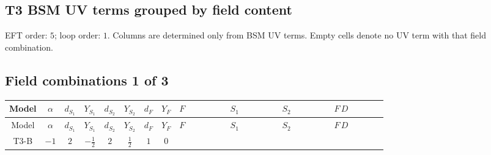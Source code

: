 \documentclass[8pt]{article}
\begin{document}
\begin{landscape}
\section*{T3 BSM UV terms grouped by field content}
EFT order: $5$; loop order: $1$. 
Columns are determined only from BSM UV terms. Empty cells denote no UV term with that field combination.
\tiny
\subsection*{Field combinations 1 of 3}
\begin{longtable}{@{}cccccccc >{\raggedright\arraybackslash}p{0.18\linewidth} >{\raggedright\arraybackslash}p{0.18\linewidth} >{\raggedright\arraybackslash}p{0.18\linewidth} >{\raggedright\arraybackslash}p{0.18\linewidth}@{}}
\toprule
Model & $\alpha$ & $d_{S_1}$ & $Y_{S_1}$ & $d_{S_2}$ & $Y_{S_2}$ & $d_F$ & $Y_F$ & $F$ & $S_1$ & $S_2$ & $F\,D$ \\
\midrule
\endfirsthead
\toprule
Model & $\alpha$ & $d_{S_1}$ & $Y_{S_1}$ & $d_{S_2}$ & $Y_{S_2}$ & $d_F$ & $Y_F$ & $F$ & $S_1$ & $S_2$ & $F\,D$ \\
\midrule
\endhead
T3-B & $-1$ & $2$ & $-\frac{1}{2}$ & $2$ & $\frac{1}{2}$ & $1$ & $0$ & \scriptsize\adjustbox{max width=\linewidth}{$\begin{gathered} -\frac{1}{2} N_{r_1}{}^T\, C\, N_{r_1} M_F\end{gathered}$} & \scriptsize\adjustbox{max width=\linewidth}{$\begin{gathered} -\text{NewScalar1}_{a_1} \text{NewScalar1}_{a_1}{}^{\dagger } M_{\text{S1}}^2 \\ +\frac{1}{2} \text{lambdaS1Inv1} \text{NewScalar1}_{a_3} \text{NewScalar1}_{a_4} \text{T3Scalar1SelfCGInv1}_{a_1,a_3,a_2,a_4} \text{NewScalar1}_{a_1}{}^{\dagger } \text{NewScalar1}_{a_2}{}^{\dagger }\end{gathered}$} & \scriptsize\adjustbox{max width=\linewidth}{$\begin{gathered} -M_{\text{S2}}^2 \text{NewScalar2}_{a_1} \text{NewScalar2}_{a_1}{}^{\dagger } \\ +\frac{1}{2} \text{lambdaS2Inv1} \text{NewScalar2}_{a_3} \text{NewScalar2}_{a_4} \text{T3Scalar2SelfCGInv1}_{a_1,a_3,a_2,a_4} \text{NewScalar2}_{a_1}{}^{\dagger } \text{NewScalar2}_{a_2}{}^{\dagger }\end{gathered}$} & \scriptsize\adjustbox{max width=\linewidth}{$\begin{gathered} +\frac{1}{2} i N_{r_1}{}^T\, C\, \gamma ^{\mu _1}\, D_{\mu _1}\left(N_{r_1}\right)\end{gathered}$} \\

\end{longtable}
\end{landscape}
\end{document}
